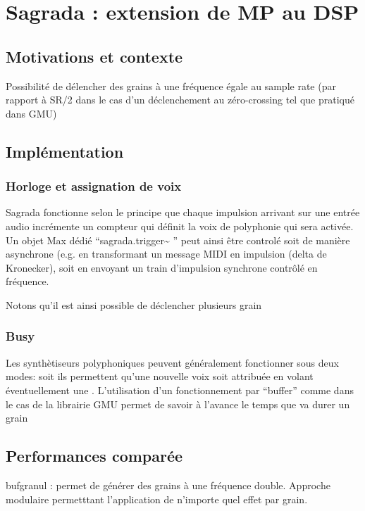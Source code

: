 \section{Sagrada : extension de MP au DSP}
\label{sec:algorithms:sagrada}

\subsection{Motivations et contexte}
Possibilité de délencher des grains à une fréquence égale au sample rate (par rapport à SR/2 dans le cas d'un déclenchement au zéro-crossing tel que pratiqué dans GMU)
\subsection{Implémentation}
\subsubsection{Horloge et assignation de voix}
Sagrada fonctionne selon le principe que chaque impulsion arrivant sur une entrée audio incrémente un compteur qui définit la voix de polyphonie qui sera activée. Un objet Max dédié ``sagrada.trigger\textasciitilde{ }'' peut ainsi être controlé soit de manière asynchrone (e.g. en transformant un message \gls{MIDI} en impulsion (delta de Kronecker), soit en envoyant un train d'impulsion synchrone contrôlé en fréquence.

Notons qu'il est ainsi possible de déclencher plusieurs grain

\subsubsection{Busy}
Les synthètiseurs polyphoniques peuvent généralement fonctionner sous deux modes: soit ils permettent qu'une nouvelle voix soit attribuée en volant éventuellement une .
L'utilisation d'un fonctionnement par ``buffer'' comme dans le cas de la librairie GMU permet de savoir à l'avance le temps que va durer un grain

\subsection{Performances comparée}
bufgranul : permet de générer des grains à une fréquence double. Approche modulaire permetttant l'application de n'importe quel effet par grain.

